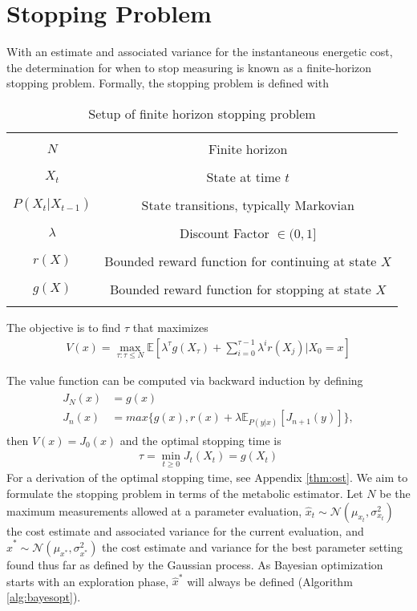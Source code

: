 \section{Stopping Problem}
With an estimate and associated variance for the instantaneous energetic cost, the determination for when to stop measuring is known as a finite-horizon stopping problem. Formally, the stopping problem is defined with

\begin{table}[h]
\centering
\begin{tabular}{ |c  c| }
  \hline&\\
  $N$ & Finite horizon\\
  &\\
  $X_t$ & State at time $t$\\
  &\\
  $P(X_t \vert X_{t-1})$ & State transitions, typically Markovian\\
  &\\
  $\lambda$ & Discount Factor $\in (0, 1]$\\
  &\\
  $r(X)$ & Bounded reward function for continuing at state $X$\\
  &\\
  $g(X)$ & Bounded reward function for stopping at state $X$\\
  &\\
  \hline
\end{tabular}
\caption{Setup of finite horizon stopping problem}
\label{tab:stopping}
\end{table}

The objective is to find $\tau$ that maximizes
\begin{align}
  V(x) = \max_{\tau: \tau \leq N} \mathbb{E}[\lambda^{\tau} g(X_{\tau}) + \sum_{i=0}^{\tau-1} \lambda^{i}r(X_j) \vert X_0 = x]
\end{align}

The value function can be computed via backward induction by defining
\begin{align}
\begin{split}
  J_N(x) &= g(x)\\
  J_n(x) &= max\{g(x), r(x) + \lambda\mathbb{E}_{P(y\vert x)}[J_{n+1}(y)]\},
\end{split}
\end{align}
then $V(x) = J_0(x)$ and the optimal stopping time is
\begin{align}
  \tau = \min_{t \geq 0}J_t(X_t) = g(X_t)
\end{align}
For a derivation of the optimal stopping time, see Appendix \ref{thm:ost}. We aim to formulate the stopping problem in terms of the metabolic estimator. Let $N$ be the maximum measurements allowed at a parameter evaluation, $\hat{x}_t \sim \mathcal{N}(\mu_{x_t}, \sigma^2_{x_t})$ the cost estimate and associated variance for the current evaluation, and $\hat{x}^* \sim \mathcal{N}(\mu_{x^*}, \sigma^2_{x^*})$ the cost estimate and variance for the best parameter setting found thus far as defined by the Gaussian process. As Bayesian optimization starts with an exploration phase, $\hat{x}^*$ will always be defined (Algorithm \ref{alg:bayesopt}).

